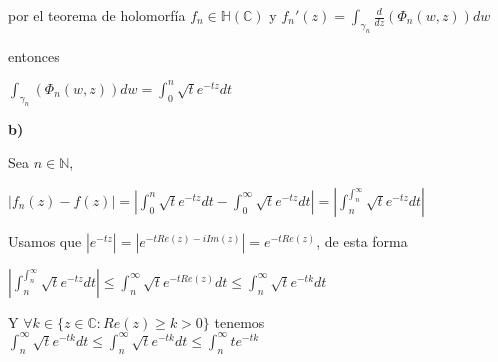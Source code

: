 por el teorema de holomorfía
$f_n \in\mathbb{H}(\mathbb{C})$ y $f_n'(z) = \int_{\gamma_n} \frac{d}{dz} (\Phi_n(w,z)) dw$

entonces

$\int_{\gamma_n}(\Phi_n(w,z)) dw = \int_0^n \sqrt{t}e^{-tz} dt$


\textbf{b)}

Sea $n\in\mathbb{N}$,

$|f_n(z) - f(z)| = |\int_{0}^{n} \sqrt{t} e^{-tz}dt - \int_{0}^{\infty} \sqrt{t}e^{-tz}dt| = |\int_{n}^{\int_n^{\infty}} \sqrt{t} e^{-tz}dt|$

Usamos que 
$|e^{-tz}| = |e^{-tRe(z)-iIm(z)}| = e^{-tRe(z)}$, de esta forma


$|\int_{n}^{\int_n^{\infty}} \sqrt{t} e^{-tz}dt| \leq \int_{n}^{\infty} \sqrt{t}e^{-tRe(z)} dt \leq \int_{n}^{\infty} \sqrt{t}e^{-tk}dt $


Y $\forall k\in \{ z\in\mathbb{C} : Re(z)\geq k > 0 \}$ tenemos
$\int_{n}^{\infty} \sqrt{t}e^{-tk}dt \leq \int_{n}^{\infty} \sqrt{t}e^{-tk} dt \leq \int_{n}^{\infty} te^{-tk}$


